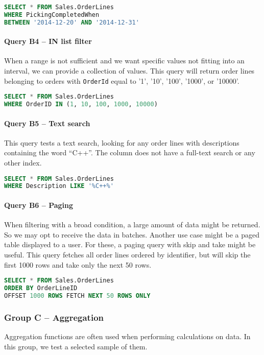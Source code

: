 \begin{lstlisting}[language=SQL]
SELECT * FROM Sales.OrderLines 
WHERE PickingCompletedWhen 
BETWEEN '2014-12-20' AND '2014-12-31'
\end{lstlisting}

\paragraph{Query B4 -- IN list filter}
\label{query:b4}
When a range is not sufficient and we want specific values not fitting into an interval, we can provide a collection of values.
This query will return order lines belonging to orders with \texttt{OrderId} equal to '1', '10', '100', '1000', or '10000'.

\begin{lstlisting}[language=SQL]
SELECT * FROM Sales.OrderLines 
WHERE OrderID IN (1, 10, 100, 1000, 10000)
\end{lstlisting}

\paragraph{Query B5 -- Text search}
\label{query:b5}
This query tests a text search, looking for any order lines with descriptions containing the word ``C++''.  The column does not have a full-text search or any other index.

\begin{lstlisting}[language=SQL]
SELECT * FROM Sales.OrderLines 
WHERE Description LIKE '%C++%'
\end{lstlisting}

\paragraph{Query B6 -- Paging}
\label{query:b6}
When filtering with a broad condition, a large amount of data might be returned. So we may opt to receive the data in batches. Another use case might be a paged table displayed to a user. For these, a paging query with skip and take might be useful.
This query fetches all order lines ordered by identifier, but will skip the first 1000 rows and take only the next 50 rows.

\begin{lstlisting}[language=SQL]
SELECT * FROM Sales.OrderLines 
ORDER BY OrderLineID 
OFFSET 1000 ROWS FETCH NEXT 50 ROWS ONLY
\end{lstlisting}

\subsubsection{Group C -- Aggregation}
Aggregation functions are often used when performing calculations on data. In this group, we test a selected sample of them.

